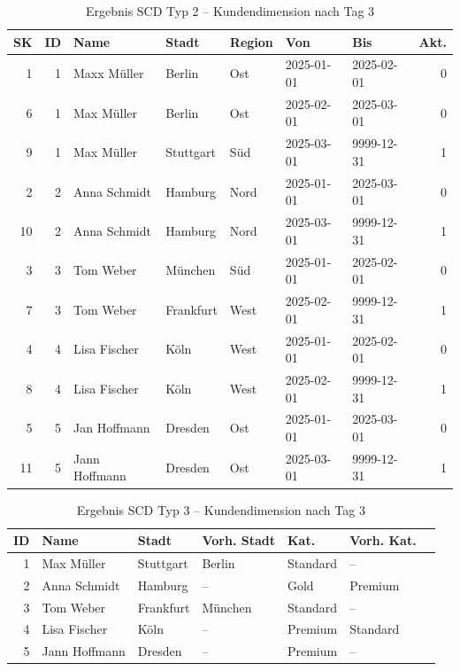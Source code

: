 \documentclass[a4paper,11pt]{article}
\begin{document}
\begin{table}[H]
\centering
\caption{Ergebnis SCD Typ 2 -- Kundendimension nach Tag 3}
\label{tab:scd2_result}
\begin{tabular}{rrlllllr}
\toprule
\textbf{SK} & \textbf{ID} & \textbf{Name} & \textbf{Stadt} & \textbf{Region} & \textbf{Von} & \textbf{Bis} & \textbf{Akt.} \\
\midrule
1 & 1 & Maxx Müller & Berlin & Ost & 2025-01-01 & 2025-02-01 & 0 \\
6 & 1 & Max Müller & Berlin & Ost & 2025-02-01 & 2025-03-01 & 0 \\
9 & 1 & Max Müller & Stuttgart & Süd & 2025-03-01 & 9999-12-31 & 1 \\
2 & 2 & Anna Schmidt & Hamburg & Nord & 2025-01-01 & 2025-03-01 & 0 \\
10 & 2 & Anna Schmidt & Hamburg & Nord & 2025-03-01 & 9999-12-31 & 1 \\
3 & 3 & Tom Weber & München & Süd & 2025-01-01 & 2025-02-01 & 0 \\
7 & 3 & Tom Weber & Frankfurt & West & 2025-02-01 & 9999-12-31 & 1 \\
4 & 4 & Lisa Fischer & Köln & West & 2025-01-01 & 2025-02-01 & 0 \\
8 & 4 & Lisa Fischer & Köln & West & 2025-02-01 & 9999-12-31 & 1 \\
5 & 5 & Jan Hoffmann & Dresden & Ost & 2025-01-01 & 2025-03-01 & 0 \\
11 & 5 & Jann Hoffmann & Dresden & Ost & 2025-03-01 & 9999-12-31 & 1 \\
\bottomrule
\end{tabular}
\end{table}

\begin{table}[H]
\centering
\caption{Ergebnis SCD Typ 3 -- Kundendimension nach Tag 3}
\label{tab:scd3_result}
\begin{tabular}{rllllll}
\toprule
\textbf{ID} & \textbf{Name} & \textbf{Stadt} & \textbf{Vorh. Stadt} & \textbf{Kat.} & \textbf{Vorh. Kat.} \\
\midrule
1 & Max Müller & Stuttgart & Berlin & Standard & -- \\
2 & Anna Schmidt & Hamburg & -- & Gold & Premium \\
3 & Tom Weber & Frankfurt & München & Standard & -- \\
4 & Lisa Fischer & Köln & -- & Premium & Standard \\
5 & Jann Hoffmann & Dresden & -- & Premium & -- \\
\bottomrule
\end{tabular}
\end{table}
\end{document}
